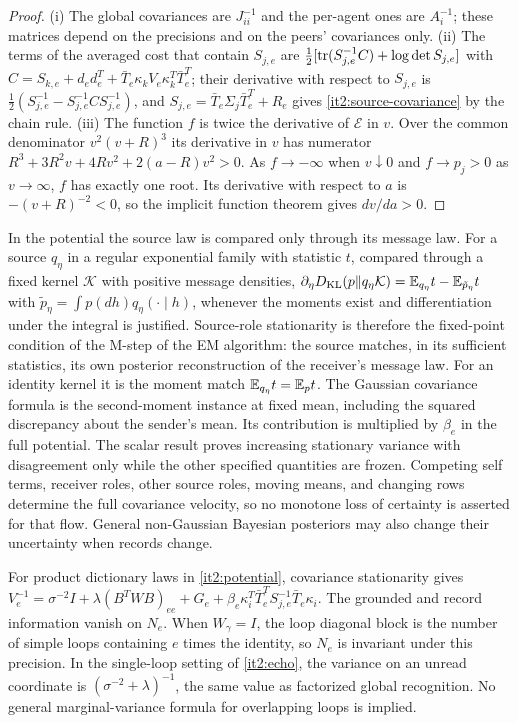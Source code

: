 \documentclass[11pt,letterpaper]{report}
\begin{document}
\begin{proof}
(i) The global covariances are $J_{ii}^{-1}$ and the per-agent ones are $A_i^{-1}$; these matrices depend on the precisions and on the peers' covariances only. (ii) The terms of the averaged cost that contain $S_{j,e}$ are $\frac12[\operatorname{tr}(S_{j,e}^{-1}C)+\log\det S_{j,e}]$ with $C=S_{k,e}+d_ed_e^T+\bar T_e\kappa_kV_e\kappa_k^T\bar T_e^T$; their derivative with respect to $S_{j,e}$ is $\frac12(S_{j,e}^{-1}-S_{j,e}^{-1}CS_{j,e}^{-1})$, and $S_{j,e}=\bar T_e\Sigma_j\bar T_e^T+R_e$ gives \cref{it2:source-covariance} by the chain rule. (iii) The function $f$ is twice the derivative of $\mathcal E$ in $v$. Over the common denominator $v^2(v+R)^3$ its derivative in $v$ has numerator $R^3+3R^2v+4Rv^2+2(a-R)v^2>0$. As $f\to-\infty$ when $v\downarrow0$ and $f\to p_j>0$ as $v\to\infty$, $f$ has exactly one root. Its derivative with respect to $a$ is $-(v+R)^{-2}<0$, so the implicit function theorem gives $dv/da>0$.
\end{proof}

In the potential the source law is compared only through its message law. For a source $q_\eta$ in a regular exponential family with statistic $t$, compared through a fixed kernel $\mathcal K$ with positive message densities, $\partial_\eta D_{\mathrm{KL}}(p\Vert q_\eta\mathcal K)=\mathbb E_{q_\eta}t-\mathbb E_{\tilde p_\eta}t$ with $\tilde p_\eta=\int p(dh)q_\eta(\cdot\mid h)$, whenever the moments exist and differentiation under the integral is justified. Source-role stationarity is therefore the fixed-point condition of the M-step of the EM algorithm: the source matches, in its sufficient statistics, its own posterior reconstruction of the receiver's message law. For an identity kernel it is the moment match $\mathbb E_{q_\eta}t=\mathbb E_pt$. The Gaussian covariance formula is the second-moment instance at fixed mean, including the squared discrepancy about the sender's mean. Its contribution is multiplied by $\beta_e$ in the full potential. The scalar result proves increasing stationary variance with disagreement only while the other specified quantities are frozen. Competing self terms, receiver roles, other source roles, moving means, and changing rows determine the full covariance velocity, so no monotone loss of certainty is asserted for that flow. General non-Gaussian Bayesian posteriors may also change their uncertainty when records change.

For product dictionary laws in \cref{it2:potential}, covariance stationarity gives $V_e^{-1}=\sigma^{-2}I+\lambda(B^TWB)_{ee}+G_e+\beta_e\kappa_i^T\bar T_e^TS_{j,e}^{-1}\bar T_e\kappa_i$. The grounded and record information vanish on $N_e$. When $W_\gamma=I$, the loop diagonal block is the number of simple loops containing $e$ times the identity, so $N_e$ is invariant under this precision. In the single-loop setting of \cref{it2:echo}, the variance on an unread coordinate is $(\sigma^{-2}+\lambda)^{-1}$, the same value as factorized global recognition. No general marginal-variance formula for overlapping loops is implied.
\end{document}
